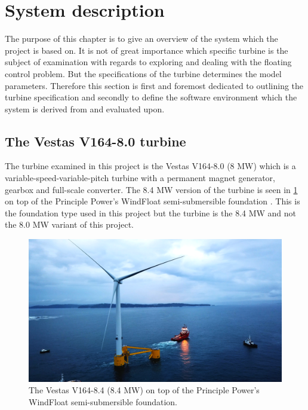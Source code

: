 \section{System description} \label{sec:sys-descr}
The purpose of this chapter is to give an overview of the system which the project is based on. It is not of great importance which specific turbine is the subject of examination with regards to exploring and dealing with the floating control problem. But the specifications of the turbine determines the model parameters. Therefore this section is first and foremost dedicated to outlining the turbine specification and secondly to define the software environment which the system is derived from and evaluated upon. 

\subsection{The Vestas V164-8.0 turbine}
The turbine examined in this project is the Vestas V164-8.0 (8 MW) which is a variable-speed-variable-pitch turbine with a permanent magnet generator, gearbox and full-scale converter. The 8.4 MW version of the turbine is seen in \cref{fig:v164_8.4mw} on top of the Principle Power’s WindFloat semi-submersible foundation \cite{WindFloatAtlantic}. This is the foundation type used in this project but the turbine is the 8.4 MW and not the 8.0 MW variant of this project.


\begin{figure}[ht]
	\centering
	\includegraphics[width=0.80\linewidth]{Graphics/v164-8_4mw_floating.png}
	\caption{The Vestas V164-8.4 (8.4 MW) on top of the Principle Power’s WindFloat semi-submersible foundation.}
	\label{fig:v164_8.4mw}
\end{figure}

